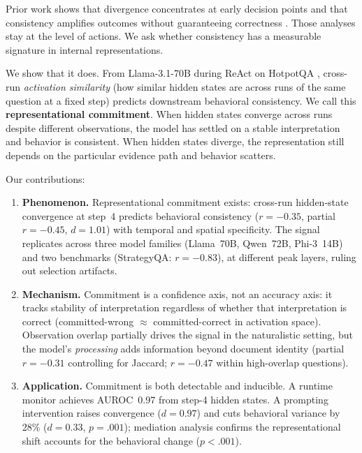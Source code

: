 \documentclass{article}
\begin{document}
Prior work shows that divergence concentrates at early decision points \citep{anonymous2026a} and that consistency amplifies outcomes without guaranteeing correctness \citep{anonymous2026b}. Those analyses stay at the level of actions. We ask whether consistency has a measurable signature in internal representations.

We show that it does. From Llama-3.1-70B \citep{llama3} during ReAct \citep{react} on HotpotQA \citep{hotpotqa}, cross-run \emph{activation similarity} (how similar hidden states are across runs of the same question at a fixed step) predicts downstream behavioral consistency. We call this \textbf{representational commitment}. When hidden states converge across runs despite different observations, the model has settled on a stable interpretation and behavior is consistent. When hidden states diverge, the representation still depends on the particular evidence path and behavior scatters.

Our contributions:
\begin{enumerate}
    \item \textbf{Phenomenon.} Representational commitment exists: cross-run hidden-state convergence at step~4 predicts behavioral consistency ($r = -0.35$, partial $r = -0.45$, $d = 1.01$) with temporal and spatial specificity. The signal replicates across three model families (Llama~70B, Qwen~72B, Phi-3~14B) and two benchmarks (StrategyQA: $r = -0.83$), at different peak layers, ruling out selection artifacts.
    \item \textbf{Mechanism.} Commitment is a confidence axis, not an accuracy axis: it tracks stability of interpretation regardless of whether that interpretation is correct (committed-wrong $\approx$ committed-correct in activation space). Observation overlap partially drives the signal in the naturalistic setting, but the model's \emph{processing} adds information beyond document identity (partial $r = -0.31$ controlling for Jaccard; $r = -0.47$ within high-overlap questions).
    \item \textbf{Application.} Commitment is both detectable and inducible. A runtime monitor achieves AUROC~0.97 from step-4 hidden states. A prompting intervention raises convergence ($d = 0.97$) and cuts behavioral variance by 28\% ($d = 0.33$, $p = .001$); mediation analysis confirms the representational shift accounts for the behavioral change ($p < .001$).
\end{enumerate}

\end{document}
